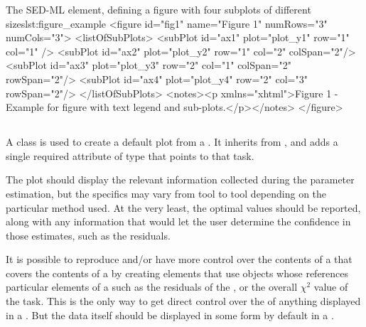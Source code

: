 \begin{blockChanged}
\begin{myXmlLst}{The SED-ML  element, defining a figure with four subplots of different sizes}{lst:figure_example}
<figure id="fig1" name="Figure 1" numRows="3" numCols="3">
    <listOfSubPlots>
        <subPlot id="ax1" plot="plot_y1" row="1" col="1" />
        <subPlot id="ax2" plot="plot_y2" row="1" col="2" colSpan="2"/>
        <subPlot id="ax3" plot="plot_y3" row="2" col="1" colSpan="2" rowSpan="2"/>
        <subPlot id="ax4" plot="plot_y4" row="2" col="3" rowSpan="2"/>
    </listOfSubPlots>
    <notes><p xmlns="xhtml">Figure 1 - Example for figure with text legend and sub-plots.</p></notes>
</figure>
\end{myXmlLst}



\subsection{}
\label{class:parameterEstimationResultsPlot}
A \ParameterEstimationResultsPlot class is used to create a default plot from a \ParameterEstimationTask.  It inherits from \Plot, and adds a single required attribute  of type \SIdRef that points to that task.


The plot should display the relevant information collected during the parameter estimation, but the specifics may vary from tool to tool depending on the particular method used.  At the very least, the optimal \AdjustableParameter values should be reported, along with any information that would let the user determine the confidence in those estimates, such as the residuals.

It is possible to reproduce and/or have more control over the contents of a \Plot that covers the contents of a \ParameterEstimationTask by creating \DataGenerator elements that use \DependentVariable objects whose  references particular elements of a \ParameterEstimationTask such as the residuals of the \Objective, or the overall $\chi^2$ value of the task.  This is the only way to get direct control over the \Style of anything displayed in a \ParameterEstimationResultsPlot.  But the data itself should be displayed in some form by default in a \ParameterEstimationReport.



\end{blockChanged}
